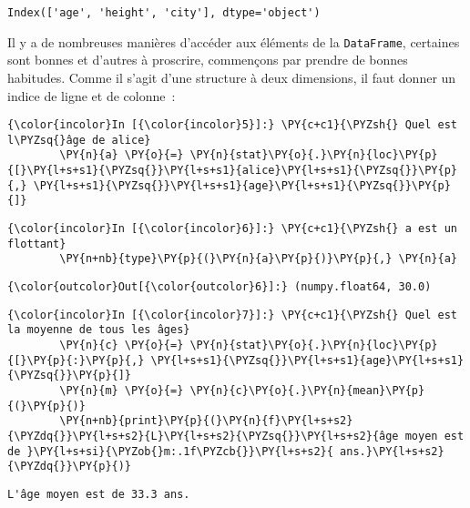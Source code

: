     \begin{Verbatim}[commandchars=\\\{\}]
Index(['age', 'height', 'city'], dtype='object')

    \end{Verbatim}

    Il y a de nombreuses manières d'accéder aux éléments de la
\texttt{DataFrame}, certaines sont bonnes et d'autres à proscrire,
commençons par prendre de bonnes habitudes. Comme il s'agit d'une
structure à deux dimensions, il faut donner un indice de ligne et de
colonne~:

    \begin{Verbatim}[commandchars=\\\{\}]
{\color{incolor}In [{\color{incolor}5}]:} \PY{c+c1}{\PYZsh{} Quel est l\PYZsq{}âge de alice}
        \PY{n}{a} \PY{o}{=} \PY{n}{stat}\PY{o}{.}\PY{n}{loc}\PY{p}{[}\PY{l+s+s1}{\PYZsq{}}\PY{l+s+s1}{alice}\PY{l+s+s1}{\PYZsq{}}\PY{p}{,} \PY{l+s+s1}{\PYZsq{}}\PY{l+s+s1}{age}\PY{l+s+s1}{\PYZsq{}}\PY{p}{]}
\end{Verbatim}


    \begin{Verbatim}[commandchars=\\\{\}]
{\color{incolor}In [{\color{incolor}6}]:} \PY{c+c1}{\PYZsh{} a est un flottant}
        \PY{n+nb}{type}\PY{p}{(}\PY{n}{a}\PY{p}{)}\PY{p}{,} \PY{n}{a}
\end{Verbatim}


\begin{Verbatim}[commandchars=\\\{\}]
{\color{outcolor}Out[{\color{outcolor}6}]:} (numpy.float64, 30.0)
\end{Verbatim}
            
    \begin{Verbatim}[commandchars=\\\{\}]
{\color{incolor}In [{\color{incolor}7}]:} \PY{c+c1}{\PYZsh{} Quel est la moyenne de tous les âges}
        \PY{n}{c} \PY{o}{=} \PY{n}{stat}\PY{o}{.}\PY{n}{loc}\PY{p}{[}\PY{p}{:}\PY{p}{,} \PY{l+s+s1}{\PYZsq{}}\PY{l+s+s1}{age}\PY{l+s+s1}{\PYZsq{}}\PY{p}{]}
        \PY{n}{m} \PY{o}{=} \PY{n}{c}\PY{o}{.}\PY{n}{mean}\PY{p}{(}\PY{p}{)}
        \PY{n+nb}{print}\PY{p}{(}\PY{n}{f}\PY{l+s+s2}{\PYZdq{}}\PY{l+s+s2}{L}\PY{l+s+s2}{\PYZsq{}}\PY{l+s+s2}{âge moyen est de }\PY{l+s+si}{\PYZob{}m:.1f\PYZcb{}}\PY{l+s+s2}{ ans.}\PY{l+s+s2}{\PYZdq{}}\PY{p}{)}
\end{Verbatim}


    \begin{Verbatim}[commandchars=\\\{\}]
L'âge moyen est de 33.3 ans.

    \end{Verbatim}

